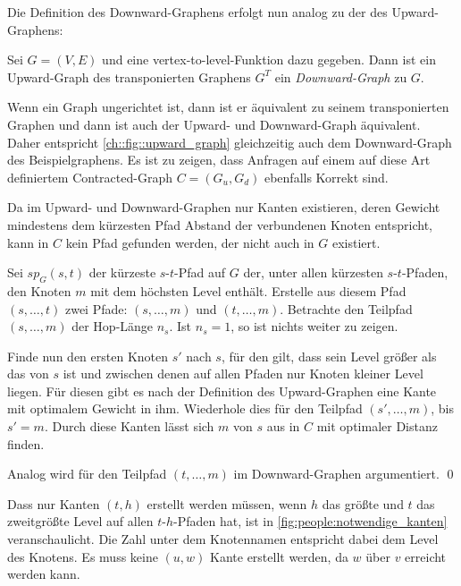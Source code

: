 Die Definition des Downward-Graphens erfolgt nun analog zu der des Upward-Graphens:

\begin{definition}
  Sei $G = (V, E)$ und eine vertex-to-level-Funktion dazu gegeben. Dann ist ein Upward-Graph des transponierten Graphens $G^T$ ein \emph{Downward-Graph} zu $G$.
\end{definition}

Wenn ein Graph ungerichtet ist, dann ist er äquivalent zu seinem transponierten Graphen und dann ist auch der Upward- und Downward-Graph äquivalent.
Daher entspricht \autoref{ch::fig::upward_graph} gleichzeitig auch dem Downward-Graph des Beispielgraphens.
Es ist zu zeigen, dass Anfragen auf einem auf diese Art definiertem Contracted-Graph $C = (G_u, G_d)$ ebenfalls Korrekt sind.

\begin{beweis}
  Da im Upward- und Downward-Graphen nur Kanten existieren, deren Gewicht mindestens dem kürzesten Pfad Abstand der verbundenen Knoten entspricht, kann in $C$ kein Pfad gefunden werden, der nicht auch in $G$ existiert.

  Sei ${sp}_G(s, t)$ der kürzeste $s$-$t$-Pfad auf $G$ der, unter allen kürzesten $s$-$t$-Pfaden, den Knoten $m$ mit dem höchsten Level enthält.
  Erstelle aus diesem Pfad $(s, \dotsc, t)$ zwei Pfade: $(s, \dotsc, m)$ und $(t, \dotsc, m)$.
  Betrachte den Teilpfad $(s, \dotsc, m)$ der Hop-Länge $n_s$.
  Ist $n_s = 1$, so ist nichts weiter zu zeigen.

  Finde nun den ersten Knoten $s'$ nach $s$, für den gilt, dass sein Level größer als das von $s$ ist und zwischen denen auf allen Pfaden nur Knoten kleiner Level liegen.
  Für diesen gibt es nach der Definition des Upward-Graphen eine Kante mit optimalem Gewicht in ihm.
  Wiederhole dies für den Teilpfad $(s', \dotsc, m)$, bis $s' = m$.
  Durch diese Kanten lässt sich $m$ von $s$ aus in $C$ mit optimaler Distanz finden.

  Analog wird für den Teilpfad $(t, \dotsc, m)$ im Downward-Graphen argumentiert.
  \qed
\end{beweis}

Dass nur Kanten $(t, h)$ erstellt werden müssen, wenn $h$ das größte und $t$ das zweitgrößte Level auf allen $t$-$h$-Pfaden hat, ist in \autoref{fig:people:notwendige_kanten} veranschaulicht.
Die Zahl unter dem Knotennamen entspricht dabei dem Level des Knotens.
Es muss keine $(u, w)$ Kante erstellt werden, da $w$ über $v$ erreicht werden kann.

